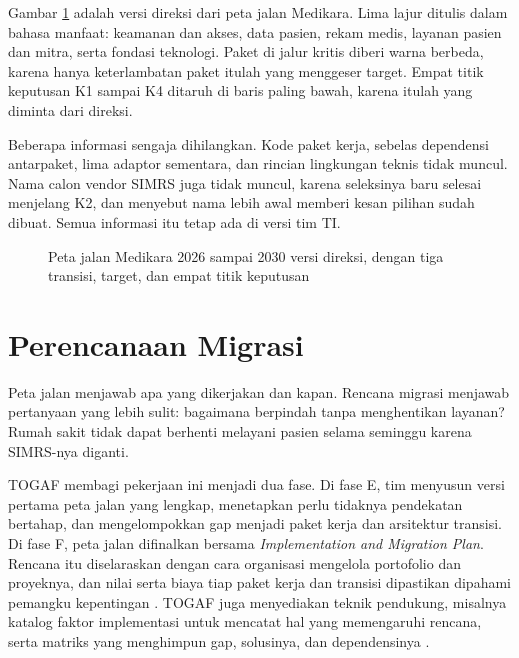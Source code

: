 \begin{kasus}[title={Kasus Medikara Health: Peta Jalan Satu Halaman untuk Direksi}]
  Gambar \ref{fig:ch12-peta-direksi} adalah versi direksi dari peta jalan
  Medikara. Lima lajur ditulis dalam bahasa manfaat: keamanan dan akses, data
  pasien, rekam medis, layanan pasien dan mitra, serta fondasi teknologi. Paket
  di jalur kritis diberi warna berbeda, karena hanya keterlambatan paket itulah
  yang menggeser target. Empat titik keputusan K1 sampai K4 ditaruh di baris
  paling bawah, karena itulah yang diminta dari direksi.

  Beberapa informasi sengaja dihilangkan. Kode paket kerja, sebelas dependensi
  antarpaket, lima adaptor sementara, dan rincian lingkungan teknis tidak
  muncul. Nama calon vendor SIMRS juga tidak muncul, karena seleksinya baru
  selesai menjelang K2, dan menyebut nama lebih awal memberi kesan pilihan
  sudah dibuat. Semua informasi itu tetap ada di versi tim TI.
\end{kasus}

\begin{figure}[!htb]
  \centering
  
  \caption{Peta jalan Medikara 2026 sampai 2030 versi direksi, dengan tiga
           transisi, target, dan empat titik keputusan}
  \label{fig:ch12-peta-direksi}
\end{figure}

\section{Perencanaan Migrasi}

Peta jalan menjawab apa yang dikerjakan dan kapan. Rencana migrasi menjawab
pertanyaan yang lebih sulit: bagaimana berpindah tanpa menghentikan layanan?
Rumah sakit tidak dapat berhenti melayani pasien selama seminggu karena
SIMRS-nya diganti.

TOGAF membagi pekerjaan ini menjadi dua fase. Di fase E, tim menyusun versi
pertama peta jalan yang lengkap, menetapkan perlu tidaknya pendekatan bertahap,
dan mengelompokkan gap menjadi paket kerja dan arsitektur transisi. Di fase F,
peta jalan difinalkan bersama \textit{Implementation and Migration Plan}.
Rencana itu diselaraskan dengan cara organisasi mengelola portofolio dan
proyeknya, dan nilai serta biaya tiap paket kerja dan transisi dipastikan
dipahami pemangku kepentingan \cite{togaf10,c12-togaf-fasef}. TOGAF juga
menyediakan teknik pendukung, misalnya katalog faktor implementasi untuk
mencatat hal yang memengaruhi rencana, serta matriks yang menghimpun gap,
solusinya, dan dependensinya \cite{c12-togaf-teknik}.

